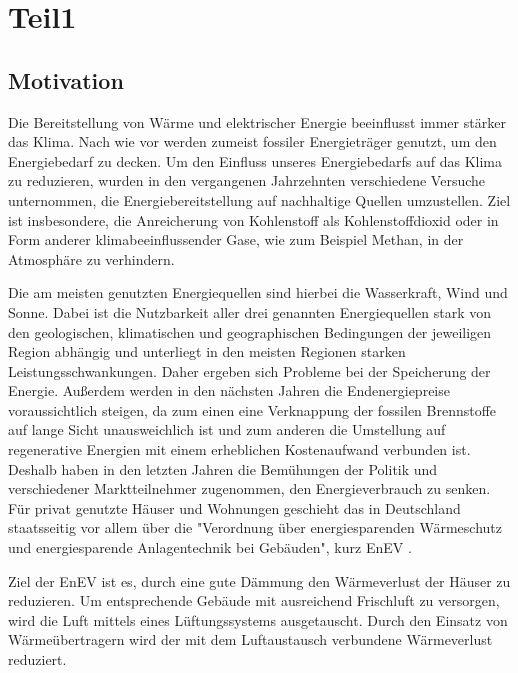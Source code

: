 \chapter{Teil1}
\label{cha:Einleitung}

\begin{normalsize}
\begin{LARGE}

\section{Motivation}
\label{sec:Motivation}

Die Bereitstellung von Wärme und elektrischer Energie beeinflusst immer stärker das Klima. Nach wie vor werden zumeist fossiler Energieträger genutzt, um den Energiebedarf zu decken. Um den Einfluss unseres Energiebedarfs auf das Klima zu reduzieren, wurden in den vergangenen Jahrzehnten verschiedene Versuche unternommen, die Energiebereitstellung auf nachhaltige Quellen umzustellen. Ziel ist insbesondere, die Anreicherung von Kohlenstoff als Kohlenstoffdioxid oder in Form anderer klimabeeinflussender Gase, wie zum Beispiel Methan, in der Atmosphäre zu verhindern. 

Die am meisten genutzten Energiequellen sind hierbei die Wasserkraft, Wind und Sonne. Dabei ist die Nutzbarkeit aller drei genannten Energiequellen stark von den geologischen, klimatischen und geographischen Bedingungen der jeweiligen Region abhängig und unterliegt in den meisten Regionen starken Leistungsschwankungen. Daher ergeben sich Probleme bei der Speicherung der Energie. Außerdem werden in den nächsten Jahren die Endenergiepreise voraussichtlich steigen, da zum einen eine Verknappung der fossilen Brennstoffe auf lange Sicht unausweichlich ist und zum anderen die Umstellung auf regenerative Energien mit einem erheblichen Kostenaufwand verbunden ist.  Deshalb haben in den letzten Jahren die Bemühungen der Politik und verschiedener Marktteilnehmer zugenommen, den Energieverbrauch zu senken. Für privat genutzte Häuser und Wohnungen geschieht das in Deutschland staatsseitig vor allem über die "Verordnung über energiesparenden Wärmeschutz und energiesparende Anlagentechnik bei Gebäuden", kurz EnEV \cite{.28.10.2015}. %

Ziel der EnEV ist es, durch eine gute Dämmung den Wärmeverlust der Häuser zu reduzieren. Um entsprechende Gebäude mit ausreichend Frischluft zu versorgen, wird die Luft mittels eines Lüftungssystems ausgetauscht. Durch den Einsatz von Wärmeübertragern wird der mit dem Luftaustausch verbundene Wärmeverlust reduziert. 


\end{LARGE}
\end{normalsize}
